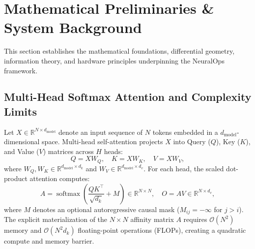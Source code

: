 \section{Mathematical Preliminaries \& System Background}
\label{sec:background}

This section establishes the mathematical foundations, differential geometry, information theory, and hardware principles underpinning the NeuralOps framework.

\subsection{Multi-Head Softmax Attention and Complexity Limits}
Let $X \in \mathbb{R}^{N \times d_{\text{model}}}$ denote an input sequence of $N$ tokens embedded in a $d_{\text{model}}$-dimensional space. Multi-head self-attention projects $X$ into Query ($Q$), Key ($K$), and Value ($V$) matrices across $H$ heads:
\begin{equation}
Q = X W_Q, \quad K = X W_K, \quad V = X W_V,
\end{equation}
where $W_Q, W_K \in \mathbb{R}^{d_{\text{model}} \times d_k}$ and $W_V \in \mathbb{R}^{d_{\text{model}} \times d_v}$. For each head, the scaled dot-product attention computes:
\begin{equation}
A = \operatorname{softmax}\left(\frac{Q K^\top}{\sqrt{d_k}} + M\right) \in \mathbb{R}^{N \times N}, \quad O = A V \in \mathbb{R}^{N \times d_v},
\end{equation}
where $M$ denotes an optional autoregressive causal mask ($M_{ij} = -\infty$ for $j > i$). The explicit materialization of the $N \times N$ affinity matrix $A$ requires $\mathcal{O}(N^2)$ memory and $\mathcal{O}(N^2 d_k)$ floating-point operations (FLOPs), creating a quadratic compute and memory barrier.

